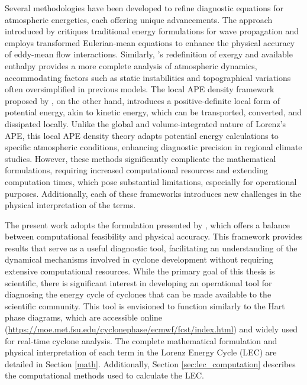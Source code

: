 Several methodologies have been developed to refine diagnostic equations for atmospheric energetics, each offering unique advancements. The approach introduced by \citet{plumb1983new} critiques traditional energy formulations for wave propagation and employs transformed Eulerian-mean equations to enhance the physical accuracy of eddy-mean flow interactions. Similarly, \citet{marquet1991concept}'s redefinition of exergy and available enthalpy provides a more complete analysis of atmospheric dynamics, accommodating factors such as static instabilities and topographical variations often oversimplified in previous models. The local APE density framework proposed by \citet{novak2018local}, on the other hand, introduces a positive-definite local form of potential energy, akin to kinetic energy, which can be transported, converted, and dissipated locally. Unlike the global and volume-integrated nature of Lorenz’s APE, this local APE density theory adapts potential energy calculations to specific atmospheric conditions, enhancing diagnostic precision in regional climate studies. However, these methods significantly complicate the mathematical formulations, requiring increased computational resources and extending computation times, which pose substantial limitations, especially for operational purposes. Additionally, each of these frameworks introduces new challenges in the physical interpretation of the terms.

The present work adopts the formulation presented by \citet{michaelides1999quasi}, which offers a balance between computational feasibility and physical accuracy. This framework provides results that serve as a useful diagnostic tool, facilitating an understanding of the dynamical mechanisms involved in cyclone development without requiring extensive computational resources. While the primary goal of this thesis is scientific, there is significant interest in developing an operational tool for diagnosing the energy cycle of cyclones that can be made available to the scientific community. This tool is envisioned to function similarly to the Hart phase diagrams, which are accessible online (\href{https://moe.met.fsu.edu/cyclonephase/ecmwf/fcst/index.html}{https://moe.met.fsu.edu/cyclonephase/ecmwf/fcst/index.html}) and widely used for real-time cyclone analysis. The complete mathematical formulation and physical interpretation of each term in the Lorenz Energy Cycle (LEC) are detailed in Section \ref{math}. Additionally, Section \ref{sec:lec_computation} describes the computational methods used to calculate the LEC.


